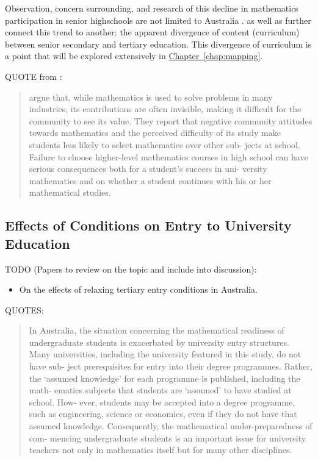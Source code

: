 \documentclass[twoside,12pt,a4paper]{report}
\newcommand{\refchap}[1]{\hyperref[chap:#1]{Chapter~\ref{chap:#1}}}
\begin{document}
Observation, concern surrounding, and research of this decline in mathematics participation in senior highschools are not limited to Australia \cite{Hourigan2007, Hoyles2001}. \cite{Hoyles2001} as well as \cite{Luk2005} further connect this trend to another: the apparent divergence of content (curriculum) between senior secondary and tertiary education. This divergence of curriculum is a point that will be explored extensively in \refchap{mapping}.


QUOTE from \cite{Gordon2013}:
\begin{quote}	
\cite{Thomas2009} argue that, while mathematics is used to solve
problems in many industries, its contributions are often invisible, making
it difficult for the community to see its value. They report that negative
community attitudes towards mathematics and the perceived difficulty of
its study make students less likely to select mathematics over other sub-
jects at school. Failure to choose higher-level mathematics courses in high
school can have serious consequences both for a student’s success in uni-
versity mathematics and on whether a student continues with his or her
mathematical studies.
\end{quote}

\subsection{Effects of Conditions on Entry to University Education}

TODO (Papers to review on the topic and include into discussion):
\begin{itemize}
	\item \cite{King2015} On the effects of relaxing tertiary entry conditions in Australia.
\end{itemize}

QUOTES:
\begin{quote}
In Australia, the situation concerning the mathematical readiness of
undergraduate students is exacerbated by university entry structures. Many
universities, including the university featured in this study, do not have sub-
ject prerequisites for entry into their degree programmes. Rather, the
‘assumed knowledge’ for each programme is published, including the math-
ematics subjects that students are ‘assumed’ to have studied at school. How-
ever, students may be accepted into a degree programme, such as
engineering, science or economics, even if they do not have that assumed
knowledge. Consequently, the mathematical under-preparedness of com-
mencing undergraduate students is an important issue for university teachers
not only in mathematics itself but for many other disciplines. 
\hfill \cite{Gordon2013}
\end{quote}
\end{document}
